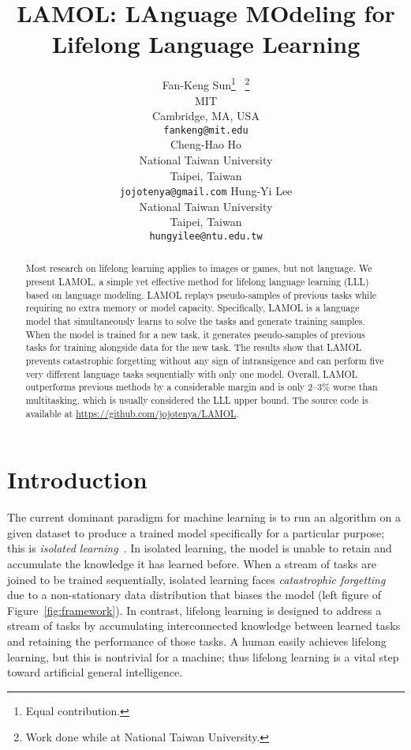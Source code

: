 \documentclass{article} \usepackage{iclr2020_conference,times}
\title{LAMOL: LAnguage MOdeling for \\
Lifelong Language Learning}
\author{Fan-Keng Sun\thanks{Equal contribution.} \, \thanks{Work done while at National Taiwan University.} \\
MIT \\
Cambridge, MA, USA \\
\texttt{fankeng@mit.edu} \\
\And
Cheng-Hao Ho\footnotemark[1] \\
National Taiwan University \\
Taipei, Taiwan \\
\texttt{jojotenya@gmail.com}
\And
Hung-Yi Lee \\
National Taiwan University \\
Taipei, Taiwan \\
\texttt{hungyilee@ntu.edu.tw}
}
\begin{document}
\maketitle

\begin{abstract}
Most research on lifelong learning applies to images or games, but not language.
We present LAMOL, a simple yet effective method for lifelong language learning (LLL) based on language modeling.
LAMOL replays pseudo-samples of previous tasks while requiring no extra memory or model capacity.
Specifically, LAMOL is a language model that simultaneously learns to solve the tasks and generate training samples.
When the model is trained for a new task, it generates pseudo-samples of previous tasks for training alongside data for the new task.
The results show that LAMOL prevents catastrophic forgetting without any sign of intransigence and can perform five very different language tasks sequentially with only one model. 
Overall, LAMOL outperforms previous methods by a considerable margin and is only 2--3\% worse than multitasking, which is usually considered the LLL upper bound.
The source code is available at \url{https://github.com/jojotenya/LAMOL}.
\end{abstract}

\section{Introduction}\label{sec:introduction}

The current dominant paradigm for machine learning is to run an algorithm on a given dataset to produce a trained model specifically for a particular purpose; this is \emph{isolated learning}~\citep[p.~150]{lll_book}. 
In isolated learning, the model is unable to retain and accumulate the knowledge it has learned before. 
When a stream of tasks are joined to be trained sequentially, isolated learning faces \emph{catastrophic forgetting}~\citep{mccloskey1989catastrophic} due to a non-stationary data distribution that biases the model (left figure of Figure~\ref{fig:framework}).
In contrast, lifelong learning is designed to address a stream of tasks by accumulating interconnected knowledge between learned tasks and retaining the performance of those tasks.
A human easily achieves lifelong learning, but this is nontrivial for a machine; thus lifelong learning is a vital step toward artificial general intelligence.
\end{document}
